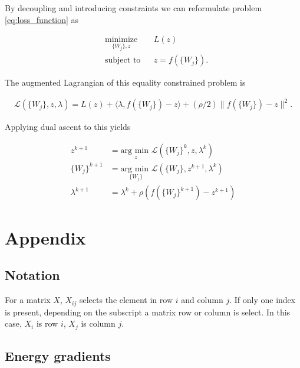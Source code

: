 \documentclass[english,11pt,a4paper]{article}
\newcommand\inner[2]{\langle #1, #2 \rangle}
\begin{document}
By decoupling and introducing constraints we can reformulate problem \ref{eq:loss_function} as

\begin{equation}
	\begin{aligned}
		& \underset{\{W_j\},z}{\text{minimize}}
		&& L(z) \\
		& \text{subject to}
		&& z = f(\{W_j\}).
	\end{aligned}
\end{equation}

The augmented Lagrangian of this equality constrained problem is

\begin{equation}
	\begin{aligned}
		\mathcal{L}(\{W_j\}, z, \lambda) = L(z) + \inner{\lambda}{f(\{W_j\})-z} + (\rho/2)\| f(\{W_j\})-z \|^2.
	\end{aligned}
\end{equation}

Applying dual ascent to this yields

\begin{equation}
	\begin{aligned}
		z^{k+1} &= \underset{z}{\text{arg min }} \mathcal{L}(\{W_j\}^k, z, \lambda^k) \\
		\{W_j\}^{k+1} &= \underset{\{W_j\}}{\text{arg min }} \mathcal{L}(\{W_j\}, z^{k+1}, \lambda^k) \\
		\lambda^{k+1} &= \lambda^k + \rho (f(\{W_j\}^{k+1})-z^{k+1})
	\end{aligned}
\end{equation}

\section{Appendix}

\subsection{Notation}

For a matrix $X$, $X_{ij}$ selects the element in row $i$ and column $j$. If only one index is present, depending on the subscript a matrix row or column is select. In this case, $X_i$ is row $i$, $X_j$ is column $j$.

\subsection{Energy gradients}
\end{document}
